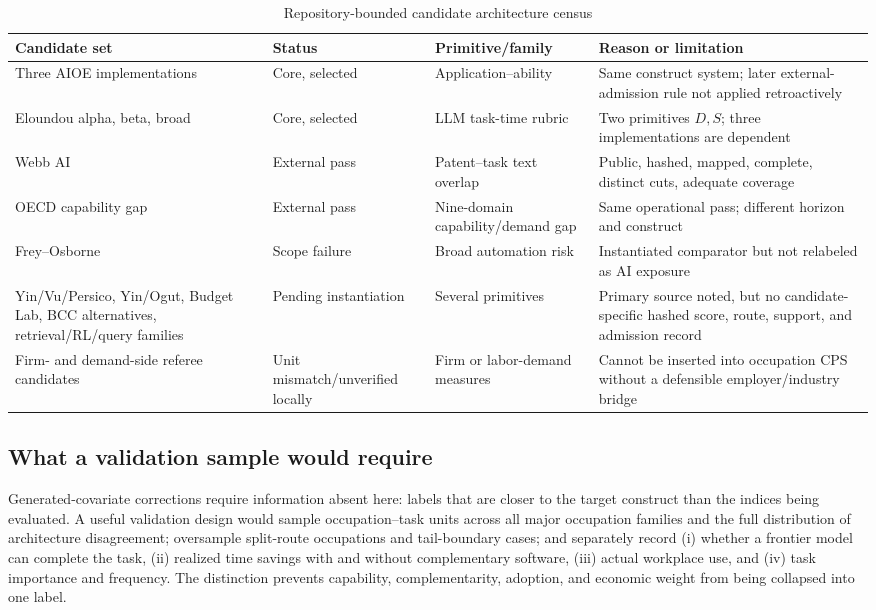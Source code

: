 \begin{table}[htbp]
\centering
\caption{Repository-bounded candidate architecture census}\label{tab:appcensus}
\scriptsize
\begin{tabularx}{\textwidth}{Yp{.18\textwidth}p{.18\textwidth}Y}
\toprule
Candidate set & Status & Primitive/family & Reason or limitation \\
\midrule
Three AIOE implementations & Core, selected & Application--ability & Same construct system; later external-admission rule not applied retroactively \\
Eloundou alpha, beta, broad & Core, selected & LLM task-time rubric & Two primitives $D,S$; three implementations are dependent \\
Webb AI & External pass & Patent--task text overlap & Public, hashed, mapped, complete, distinct cuts, adequate coverage \\
OECD capability gap & External pass & Nine-domain capability/demand gap & Same operational pass; different horizon and construct \\
Frey--Osborne & Scope failure & Broad automation risk & Instantiated comparator but not relabeled as AI exposure \\
Yin/Vu/Persico, Yin/Ogut, Budget Lab, BCC alternatives, retrieval/RL/query families & Pending instantiation & Several primitives & Primary source noted, but no candidate-specific hashed score, route, support, and admission record \\
Firm- and demand-side referee candidates & Unit mismatch/unverified locally & Firm or labor-demand measures & Cannot be inserted into occupation CPS without a defensible employer/industry bridge \\
\bottomrule
\end{tabularx}
\end{table}

\subsection{What a validation sample would require}

Generated-covariate corrections require information absent here: labels that are closer to the target construct than the indices being evaluated. A useful validation design would sample occupation--task units across all major occupation families and the full distribution of architecture disagreement; oversample split-route occupations and tail-boundary cases; and separately record (i) whether a frontier model can complete the task, (ii) realized time savings with and without complementary software, (iii) actual workplace use, and (iv) task importance and frequency. The distinction prevents capability, complementarity, adoption, and economic weight from being collapsed into one label.

